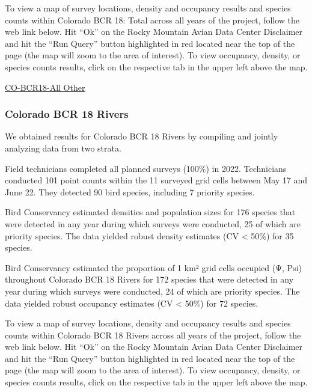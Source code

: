 \documentclass[
  letterpaper,
  DIV=11,
  numbers=noendperiod,
  oneside]{scrreprt}
\begin{document}
To view a map of survey locations, density and occupancy results and
species counts within Colorado BCR 18: Total across all years of the
project, follow the web link below. Hit ``Ok'' on the Rocky Mountain
Avian Data Center Disclaimer and hit the ``Run Query'' button
highlighted in red located near the top of the page (the map will zoom
to the area of interest). To view occupancy, density, or species counts
results, click on the respective tab in the upper left above the map.

\href{http://www.rmbo.org/new_site/adc/QueryWindow.aspx\#N4IgzgrgDgpgTmALnAhoiBbEAuABCAYQHkBaAIQICUBGADhIEEAbJ3IxAC3hAF8g}{CO-BCR18-All
Other}

\hypertarget{colorado-bcr-18-rivers}{%
\subsubsection{Colorado BCR 18 Rivers}\label{colorado-bcr-18-rivers}}

We obtained results for Colorado BCR 18 Rivers by compiling and jointly
analyzing data from two strata.

Field technicians completed all planned surveys (100\%) in 2022.
Technicians conducted 101 point counts within the 11 surveyed grid cells
between May 17 and June 22. They detected 90 bird species, including 7
priority species.

Bird Conservancy estimated densities and population sizes for 176
species that were detected in any year during which surveys were
conducted, 25 of which are priority species. The data yielded robust
density estimates (CV \textless{} 50\%) for 35 species.

Bird Conservancy estimated the proportion of 1 km² grid cells occupied
(Ψ, Psi) throughout Colorado BCR 18 Rivers for 172 species that were
detected in any year during which surveys were conducted, 24 of which
are priority species. The data yielded robust occupancy estimates (CV
\textless{} 50\%) for 72 species.

To view a map of survey locations, density and occupancy results and
species counts within Colorado BCR 18 Rivers across all years of the
project, follow the web link below. Hit ``Ok'' on the Rocky Mountain
Avian Data Center Disclaimer and hit the ``Run Query'' button
highlighted in red located near the top of the page (the map will zoom
to the area of interest). To view occupancy, density, or species counts
results, click on the respective tab in the upper left above the map.
\end{document}
